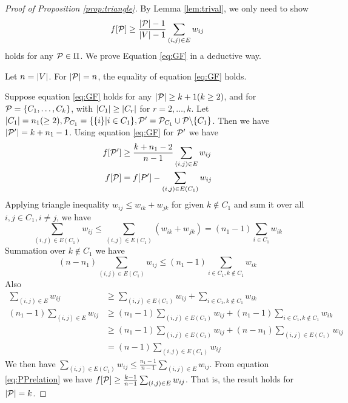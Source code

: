 \begin{proof}[Proof of Proposition \ref{prop:triangle}]
By Lemma \ref{lem:trival}, we only need to show
\begin{equation}\label{eq:GF}
f[\P] \geq \frac{\abs{\P}-1}{\abs{V}-1} \sum_{(i,j) \in E} w_{ij}
\end{equation}
holds for any $\P \in \Pi$. We prove Equation \ref{eq:GF} in a deductive way.

Let $n=\abs{V}$. For $\abs{\P}=n$, the equality of equation \ref{eq:GF} holds. 

Suppose equation \eqref{eq:GF} holds for any $\abs{\P} \geq k+1(k\geq 2)$, and for $\P=\{C_1, \dots, C_k\}$, with $\abs{C_1} \geq \abs{C_r}$ for $r=2,\dots, k$. Let $\abs{C_1}=n_1(\geq 2), \P_{C_1} = \{\{i\}| i \in C_1\}, \P'=\P_{C_1} \cup \P \backslash \{C_1\}$. Then we have $\abs{\P'} = k+n_1-1$. Using equation \eqref{eq:GF} for $\P'$ we have
\begin{align}\label{eq:PPrelation}
f[\P'] & \geq \frac{k+n_1 -2}{n-1}\sum_{(i,j) \in E} w_{ij} \\
f[\P] & =f[P'] - \sum_{(i,j) \in E(C_1)} w_{ij}
\end{align}
Applying triangle inequality $w_{ij} \leq w_{ik} + w_{jk}$ for given $k\not\in C_1$ and sum it over all $i, j \in C_1, i\neq j$, we have
$$
\sum_{(i,j) \in E(C_1)} w_{ij} \leq \sum_{(i,j) \in E(C_1)} (w_{ik} + w_{jk}) = (n_1-1)\sum_{i\in C_1} w_{ik}
$$
Summation over $k \not\in C_1$ we have 
$$
(n - n_1) \sum_{(i,j) \in E(C_1)} w_{ij} \leq (n_1 - 1) \sum_{i \in C_1, k \not\in C_1} w_{ik}
$$
Also
\begin{align*}
\sum_{(i,j) \in E} w_{ij}  & \geq \sum_{(i,j) \in E(C_1)} w_{ij} + \sum_{i\in C_1, k\not\in C_1} w_{ik} \\
(n_1 - 1)\sum_{(i,j) \in E} w_{ij}  & \geq (n_1 -1 )\sum_{(i,j) \in E(C_1)} w_{ij} + (n_1-1)\sum_{i\in C_1, k\not\in C_1} w_{ik} \\
& \geq (n_1 -1 )\sum_{(i,j) \in E(C_1)} w_{ij} + (n - n_1) \sum_{(i,j) \in E(C_1)} w_{ij}\\
& = (n-1) \sum_{(i,j) \in E(C_1)} w_{ij}
\end{align*}
We then have $\sum_{(i,j) \in E(C_1)} w_{ij} \leq \frac{n_1-1}{n-1}\sum_{(i,j) \in E} w_{ij}$. From equation \eqref{eq:PPrelation} we have 
$f[\P] \geq \frac{k-1}{n-1}\sum_{(i,j) \in E} w_{ij}$. That is, the result holds for $\abs{\P}=k$.
\end{proof}


